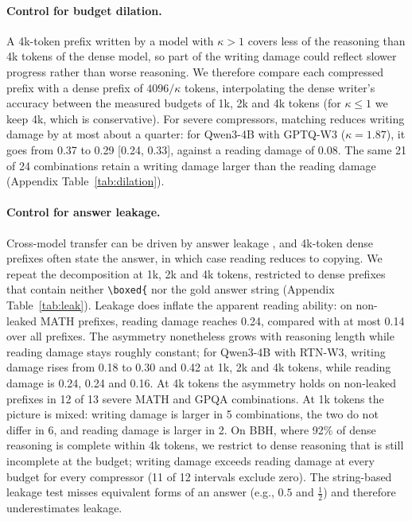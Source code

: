 \documentclass[10pt]{article}
\begin{document}
\paragraph{Control for budget dilation.}
A 4k-token prefix written by a model with $\kappa>1$ covers less of the reasoning than 4k tokens of the dense model, so part of the writing damage could reflect slower progress rather than worse reasoning. We therefore compare each compressed prefix with a dense prefix of $4096/\kappa$ tokens, interpolating the dense writer's accuracy between the measured budgets of 1k, 2k and 4k tokens (for $\kappa\le1$ we keep 4k, which is conservative). For severe compressors, matching reduces writing damage by at most about a quarter: for Qwen3-4B with GPTQ-W3 ($\kappa=1.87$), it goes from 0.37 to 0.29 [0.24, 0.33], against a reading damage of 0.08. The same 21 of 24 combinations retain a writing damage larger than the reading damage (Appendix Table~\ref{tab:dilation}).

\paragraph{Control for answer leakage.}
Cross-model transfer can be driven by answer leakage \citep{cheng2026travels}, and 4k-token dense prefixes often state the answer, in which case reading reduces to copying. We repeat the decomposition at 1k, 2k and 4k tokens, restricted to dense prefixes that contain neither \texttt{\textbackslash boxed\{} nor the gold answer string (Appendix Table~\ref{tab:leak}). Leakage does inflate the apparent reading ability: on non-leaked MATH prefixes, reading damage reaches 0.24, compared with at most 0.14 over all prefixes. The asymmetry nonetheless grows with reasoning length while reading damage stays roughly constant; for Qwen3-4B with RTN-W3, writing damage rises from 0.18 to 0.30 and 0.42 at 1k, 2k and 4k tokens, while reading damage is 0.24, 0.24 and 0.16. At 4k tokens the asymmetry holds on non-leaked prefixes in 12 of 13 severe MATH and GPQA combinations. At 1k tokens the picture is mixed: writing damage is larger in 5 combinations, the two do not differ in 6, and reading damage is larger in 2. On BBH, where 92\% of dense reasoning is complete within 4k tokens, we restrict to dense reasoning that is still incomplete at the budget; writing damage exceeds reading damage at every budget for every compressor (11 of 12 intervals exclude zero). The string-based leakage test misses equivalent forms of an answer (e.g., $0.5$ and $\frac12$) and therefore underestimates leakage.
\end{document}

